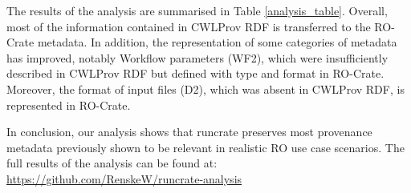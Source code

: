 \documentclass[10pt,letterpaper]{article}
\begin{document}
The results of the analysis are summarised in Table
\ref{analysis_table}.
Overall, most of the information contained in CWLProv RDF is transferred to the RO-Crate metadata.
In addition, the representation of some categories of metadata has improved, notably Workflow parameters (WF2), which were insufficiently described in CWLProv RDF but defined with type and format in RO-Crate.
Moreover, the format of input files (D2), which was absent in CWLProv RDF, is represented in RO-Crate.

In conclusion, our analysis shows that runcrate preserves most provenance metadata previously shown to be relevant in realistic RO use case scenarios.
The full results of the analysis can be found at: \url{https://github.com/RenskeW/runcrate-analysis}
\end{document}
